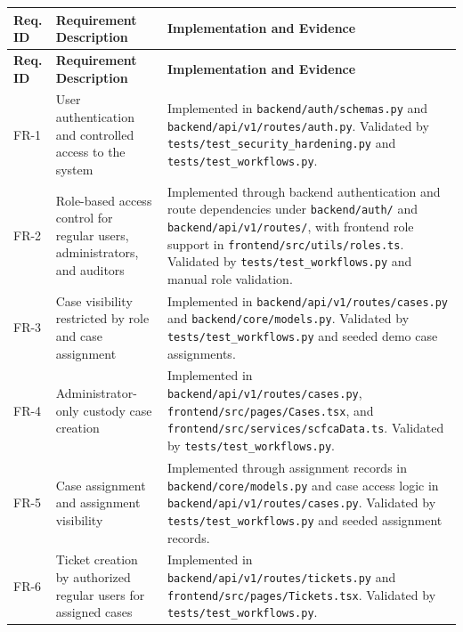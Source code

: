 \documentclass[12pt,a4paper]{report}
\begin{document}
\begin{longtable}{|p{1.1cm}|p{5.0cm}|p{9.0cm}|}
\hline
\textbf{Req. ID} & \textbf{Requirement Description} & \textbf{Implementation and Evidence} \\
\hline
\endfirsthead

\hline
\textbf{Req. ID} & \textbf{Requirement Description} & \textbf{Implementation and Evidence} \\
\hline
\endhead

FR-1 & User authentication and controlled access to the system &
Implemented in \texttt{backend/auth/schemas.py} and \texttt{backend/api/v1/routes/auth.py}. Validated by \texttt{tests/test\_security\_hardening.py} and \texttt{tests/test\_workflows.py}. \\
\hline

FR-2 & Role-based access control for regular users, administrators, and auditors &
Implemented through backend authentication and route dependencies under \texttt{backend/auth/} and \texttt{backend/api/v1/routes/}, with frontend role support in \texttt{frontend/src/utils/roles.ts}. Validated by \texttt{tests/test\_workflows.py} and manual role validation. \\
\hline

FR-3 & Case visibility restricted by role and case assignment &
Implemented in \texttt{backend/api/v1/routes/cases.py} and \texttt{backend/core/models.py}. Validated by \texttt{tests/test\_workflows.py} and seeded demo case assignments. \\
\hline

FR-4 & Administrator-only custody case creation &
Implemented in \texttt{backend/api/v1/routes/cases.py}, \texttt{frontend/src/pages/Cases.tsx}, and \texttt{frontend/src/services/scfcaData.ts}. Validated by \texttt{tests/test\_workflows.py}. \\
\hline

FR-5 & Case assignment and assignment visibility &
Implemented through assignment records in \texttt{backend/core/models.py} and case access logic in \texttt{backend/api/v1/routes/cases.py}. Validated by \texttt{tests/test\_workflows.py} and seeded assignment records. \\
\hline

FR-6 & Ticket creation by authorized regular users for assigned cases &
Implemented in \texttt{backend/api/v1/routes/tickets.py} and \texttt{frontend/src/pages/Tickets.tsx}. Validated by \texttt{tests/test\_workflows.py}. \\
\hline


\end{longtable}
\end{document}
